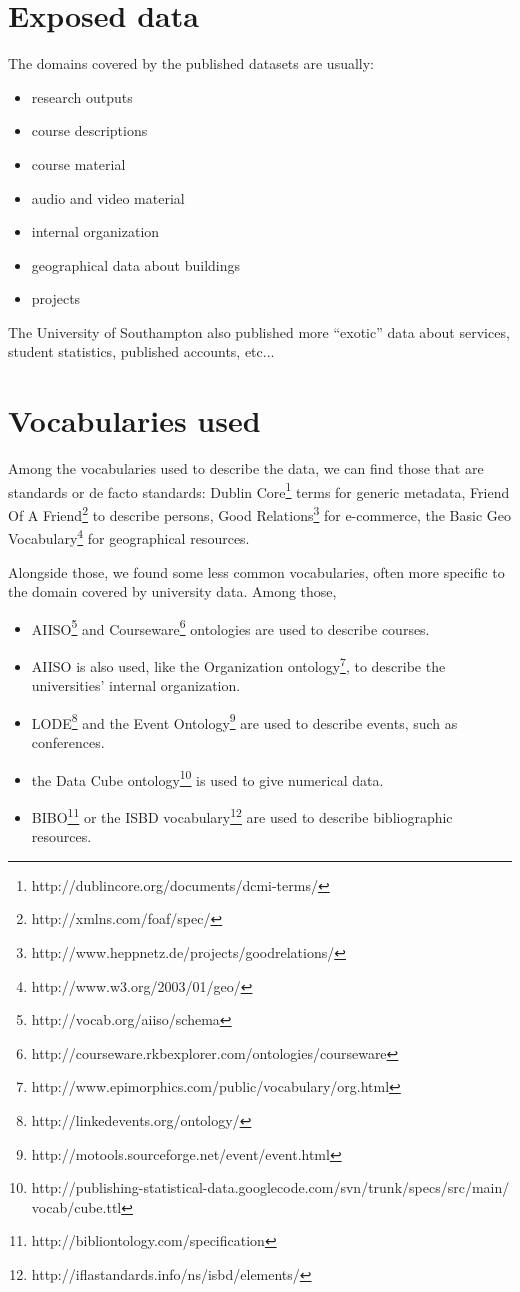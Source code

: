 \documentclass[a4paper,11pt]{report}
\begin{document}
\section{Exposed data}
The domains covered by the published datasets are usually:
\begin{itemize}
\item research outputs
\item course descriptions
\item course material
\item audio and video material
\item internal organization
\item geographical data about buildings
\item projects
\end{itemize}
The University of Southampton also published more ``exotic'' data about services, student statistics, published accounts, etc...

\section{Vocabularies used}
Among the vocabularies used to describe the data, we can find those that are standards or de facto standards: Dublin Core\footnote{http://dublincore.org/documents/dcmi-terms/} terms for generic metadata, Friend Of A Friend\footnote{http://xmlns.com/foaf/spec/} to describe persons, Good Relations\footnote{http://www.heppnetz.de/projects/goodrelations/} for e-commerce, the Basic Geo Vocabulary\footnote{http://www.w3.org/2003/01/geo/} for geographical resources.

Alongside those, we found some less common vocabularies, often more specific to the domain covered by university data. Among those,
\begin{itemize}
\item AIISO\footnote{http://vocab.org/aiiso/schema} and Courseware\footnote{http://courseware.rkbexplorer.com/ontologies/courseware} ontologies are used to describe courses.
\item AIISO is also used, like the Organization ontology\footnote{http://www.epimorphics.com/public/vocabulary/org.html}, to describe the universities' internal organization.
\item LODE\footnote{http://linkedevents.org/ontology/} and the Event Ontology\footnote{http://motools.sourceforge.net/event/event.html} are used to describe events, such as conferences.
\item the Data Cube ontology\footnote{http://publishing-statistical-data.googlecode.com/svn/trunk/specs/src/main/\\vocab/cube.ttl} is used to give numerical data.
\item BIBO\footnote{http://bibliontology.com/specification} or the ISBD vocabulary\footnote{http://iflastandards.info/ns/isbd/elements/} are used to describe bibliographic resources.
\end{itemize}
\end{document}

